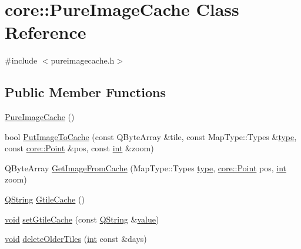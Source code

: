 \hypertarget{classcore_1_1_pure_image_cache}{\section{core\-:\-:Pure\-Image\-Cache Class Reference}
\label{classcore_1_1_pure_image_cache}
}


{\ttfamily \#include $<$pureimagecache.\-h$>$}

\subsection*{Public Member Functions}
\begin{DoxyCompactItemize}
\item 
\hyperlink{group___o_p_map_widget_ga28510761dcb972fdc54b26b91f199770}{Pure\-Image\-Cache} ()
\item 
bool \hyperlink{group___o_p_map_widget_gaabe1bf4c819005ff575270660c86503e}{Put\-Image\-To\-Cache} (const Q\-Byte\-Array \&tile, const Map\-Type\-::\-Types \&\hyperlink{glext_8h_a7d05960f4f1c1b11f3177dc963a45d86}{type}, const \hyperlink{structcore_1_1_point}{core\-::\-Point} \&pos, const \hyperlink{ioapi_8h_a787fa3cf048117ba7123753c1e74fcd6}{int} \&zoom)
\item 
Q\-Byte\-Array \hyperlink{group___o_p_map_widget_gae7df6a861aa9bec0d6cb196ef1de84b1}{Get\-Image\-From\-Cache} (Map\-Type\-::\-Types \hyperlink{glext_8h_a7d05960f4f1c1b11f3177dc963a45d86}{type}, \hyperlink{structcore_1_1_point}{core\-::\-Point} pos, \hyperlink{ioapi_8h_a787fa3cf048117ba7123753c1e74fcd6}{int} zoom)
\item 
\hyperlink{group___u_a_v_objects_plugin_gab9d252f49c333c94a72f97ce3105a32d}{Q\-String} \hyperlink{group___o_p_map_widget_ga30cc962d96388e3769ca3807c35d84ed}{Gtile\-Cache} ()
\item 
\hyperlink{group___u_a_v_objects_plugin_ga444cf2ff3f0ecbe028adce838d373f5c}{void} \hyperlink{group___o_p_map_widget_gaf4e3245a367b45b888ca368f03ae9300}{set\-Gtile\-Cache} (const \hyperlink{group___u_a_v_objects_plugin_gab9d252f49c333c94a72f97ce3105a32d}{Q\-String} \&\hyperlink{glext_8h_aa0e2e9cea7f208d28acda0480144beb0}{value})
\item 
\hyperlink{group___u_a_v_objects_plugin_ga444cf2ff3f0ecbe028adce838d373f5c}{void} \hyperlink{group___o_p_map_widget_ga1ae13fc8322336ab8de6f1c6ad09793c}{delete\-Older\-Tiles} (\hyperlink{ioapi_8h_a787fa3cf048117ba7123753c1e74fcd6}{int} const \&days)
\end{DoxyCompactItemize}
